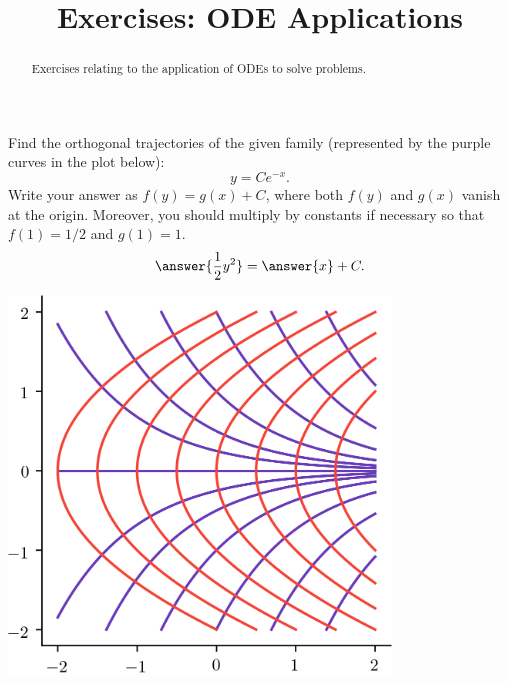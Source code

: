\documentclass{ximera}
\title{Exercises: ODE Applications}
\begin{document}
\begin{abstract}
Exercises relating to the application of ODEs to solve problems.
\end{abstract}
\maketitle



\begin{exercise}
Find the orthogonal trajectories of the given family (represented by the purple curves in the plot below):
\[ y = C e^{-x}. \]
Write your answer as $f(y) = g(x) + C$, where both $f(y)$ and $g(x)$ vanish at the origin. Moreover, you should multiply by constants if necessary so that $f(1) = 1/2$ and $g(1) = 1$. 
\[ \answer{\frac{1}{2} y^2} = \answer{x} + C. \]
\begin{center}
\begin{image}
\includegraphics[width=4in]{images/ortho01.png}
\end{image}
\end{center}

\end{exercise}
\end{document}
